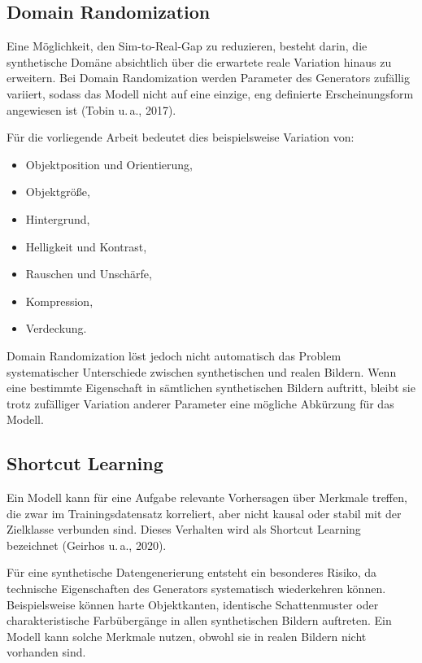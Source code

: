 \subsection{Domain Randomization}

Eine Möglichkeit, den Sim-to-Real-Gap zu reduzieren, besteht darin, die synthetische Domäne absichtlich über die erwartete reale Variation hinaus zu erweitern. Bei Domain Randomization werden Parameter des Generators zufällig variiert, sodass das Modell nicht auf eine einzige, eng definierte Erscheinungsform angewiesen ist (Tobin u.\,a., 2017).

Für die vorliegende Arbeit bedeutet dies beispielsweise Variation von:
\begin{itemize}
    \item Objektposition und Orientierung,
    \item Objektgröße,
    \item Hintergrund,
    \item Helligkeit und Kontrast,
    \item Rauschen und Unschärfe,
    \item Kompression,
    \item Verdeckung.
\end{itemize}

Domain Randomization löst jedoch nicht automatisch das Problem systematischer Unterschiede zwischen synthetischen und realen Bildern. Wenn eine bestimmte Eigenschaft in sämtlichen synthetischen Bildern auftritt, bleibt sie trotz zufälliger Variation anderer Parameter eine mögliche Abkürzung für das Modell.

\subsection{Shortcut Learning}

Ein Modell kann für eine Aufgabe relevante Vorhersagen über Merkmale treffen, die zwar im Trainingsdatensatz korreliert, aber nicht kausal oder stabil mit der Zielklasse verbunden sind. Dieses Verhalten wird als Shortcut Learning bezeichnet (Geirhos u.\,a., 2020).

Für eine synthetische Datengenerierung entsteht ein besonderes Risiko, da technische Eigenschaften des Generators systematisch wiederkehren können. Beispielsweise können harte Objektkanten, identische Schattenmuster oder charakteristische Farbübergänge in allen synthetischen Bildern auftreten. Ein Modell kann solche Merkmale nutzen, obwohl sie in realen Bildern nicht vorhanden sind.

